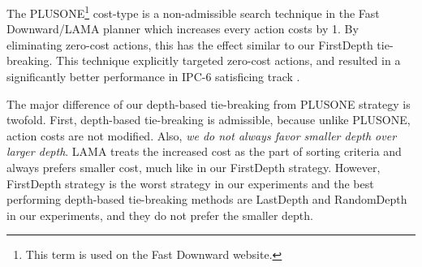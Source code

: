 The PLUSONE\footnote{This term is used on the Fast Downward website.}
cost-type is a non-admissible search technique in the Fast Downward/LAMA planner
\cite{richter2010lama} which increases every action costs by 1.
By eliminating zero-cost actions, this has the effect similar to our
FirstDepth tie-breaking.
This technique explicitly targeted zero-cost actions,
and resulted in a significantly better performance in IPC-6
satisficing track \cite[p.137, Sec. 3.3.2]{richter2010lama}.

The major difference of our depth-based tie-breaking from PLUSONE
strategy is twofold.  First, depth-based tie-breaking is admissible,
because unlike PLUSONE, action costs are not modified.  Also, \emph{we
do not always favor smaller depth over larger depth}. LAMA treats the
increased cost as the part of sorting criteria and always prefers
smaller cost, much like in our FirstDepth strategy.  However, FirstDepth
strategy is the worst strategy in our experiments and the best
performing depth-based tie-breaking methods are LastDepth and RandomDepth
in our experiments, and they do not prefer the smaller depth.

